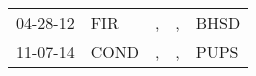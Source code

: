 \begin{supertabular}{lllll}
 04-28-12 &   FIR &  , &  , &  BHSD \\
 11-07-14 &  COND &  , &  , &  PUPS \\
\end{supertabular}
